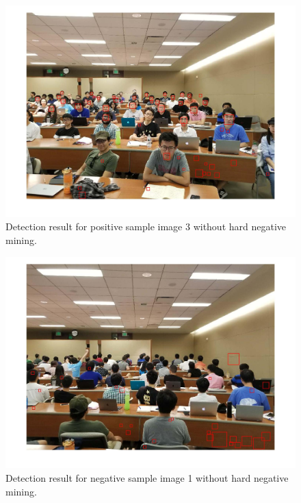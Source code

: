 \documentclass[10pt]{article}
\begin{document}
	\newpage\begin{figure}[ht]
		\includegraphics[width=\textwidth]{detection_face_3.jpg}
		\centering
		\caption{Detection result for positive sample image 3 without hard negative mining.}
		\label{10}
	\end{figure}
	\newpage\begin{figure}[ht]
		\includegraphics[width=\textwidth]{detection_nonface_1.jpg}
		\centering
		\caption{Detection result for negative sample image 1 without hard negative mining.}
		\label{11}
	\end{figure}
\end{document}
